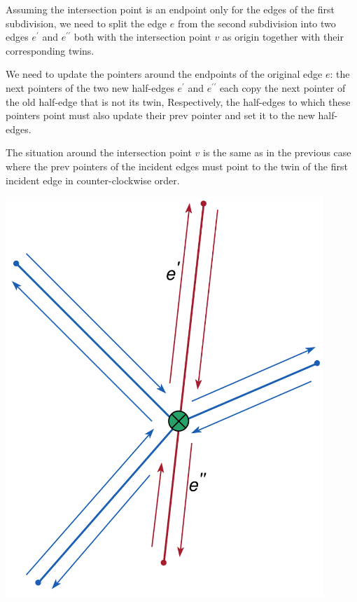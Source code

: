 \begin{minipage}{0.7\textwidth}
    Assuming the intersection point is an endpoint only for the edges of the first subdivision, we need to split the edge $e$ from the second subdivision into two edges $e^{\prime}$ and $e^{\prime\prime}$ both with the intersection point $v$ as origin together with their corresponding twins.

    We need to update the pointers around the endpoints of the original edge $e$: the next pointers of the two new half-edges $e^{\prime}$ and $e^{\prime\prime}$ each copy the next pointer of the old half-edge that is not its twin, Respectively, the half-edges to which these pointers point must also update their prev pointer and set it to the new half-edges.

    The situation around the intersection point $v$ is the same as in the previous case where the prev pointers of the incident edges must point to the twin of the first incident edge in counter-clockwise order.
\end{minipage}\hfill
\begin{minipage}{0.3\textwidth}
    \centering
    \includegraphics[width=0.9\textwidth]{images/int1.png}
\end{minipage}
\break

